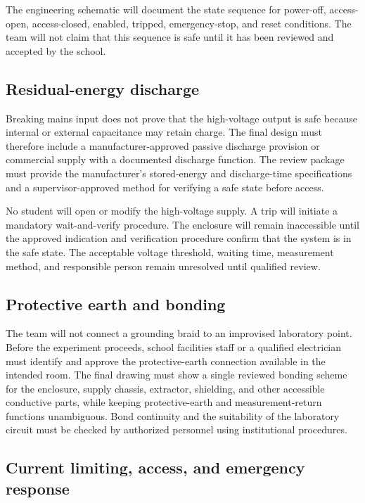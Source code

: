 \documentclass[11pt]{article}
\begin{document}
The engineering schematic will document the state sequence for power-off, access-open, access-closed, enabled, tripped, emergency-stop, and reset conditions. The team will not claim that this sequence is safe until it has been reviewed and accepted by the school.

\subsection{Residual-energy discharge}

Breaking mains input does not prove that the high-voltage output is safe because internal or external capacitance may retain charge. The final design must therefore include a manufacturer-approved passive discharge provision or commercial supply with a documented discharge function. The review package must provide the manufacturer's stored-energy and discharge-time specifications and a supervisor-approved method for verifying a safe state before access.

No student will open or modify the high-voltage supply. A trip will initiate a mandatory wait-and-verify procedure. The enclosure will remain inaccessible until the approved indication and verification procedure confirm that the system is in the safe state. The acceptable voltage threshold, waiting time, measurement method, and responsible person remain unresolved until qualified review.

\subsection{Protective earth and bonding}

The team will not connect a grounding braid to an improvised laboratory point. Before the experiment proceeds, school facilities staff or a qualified electrician must identify and approve the protective-earth connection available in the intended room. The final drawing must show a single reviewed bonding scheme for the enclosure, supply chassis, extractor, shielding, and other accessible conductive parts, while keeping protective-earth and measurement-return functions unambiguous. Bond continuity and the suitability of the laboratory circuit must be checked by authorized personnel using institutional procedures.

\subsection{Current limiting, access, and emergency response}
\end{document}
